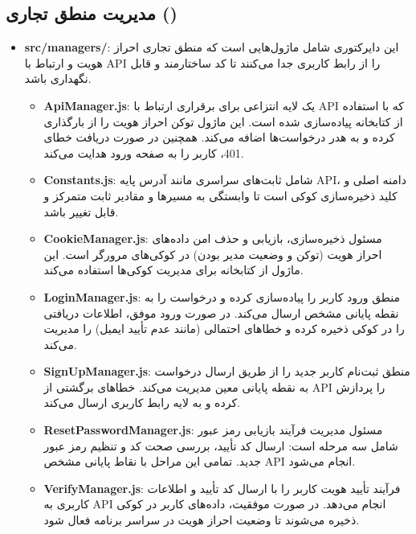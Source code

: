     \subsection{مدیریت منطق تجاری ()}
    \begin{itemize}
    	\item \textbf{src/managers/}: این دایرکتوری شامل ماژول‌هایی است که منطق تجاری احراز هویت و ارتباط با API را از رابط کاربری جدا می‌کنند تا کد ساختارمند و قابل نگهداری باشد.
    	\begin{itemize}
    		\item \textbf{ApiManager.js}: یک لایه انتزاعی برای برقراری ارتباط با API که با استفاده از کتابخانه  پیاده‌سازی شده است. این ماژول توکن احراز هویت را از  بارگذاری کرده و به هدر درخواست‌ها اضافه می‌کند. همچنین در صورت دریافت خطای 401، کاربر را به صفحه ورود هدایت می‌کند.
    		\item \textbf{Constants.js}: شامل ثابت‌های سراسری مانند آدرس پایه API، دامنه اصلی و کلید ذخیره‌سازی کوکی است تا وابستگی به مسیرها و مقادیر ثابت متمرکز و قابل تغییر باشد.
    		\item \textbf{CookieManager.js}: مسئول ذخیره‌سازی، بازیابی و حذف امن داده‌های احراز هویت (توکن و وضعیت مدیر بودن) در کوکی‌های مرورگر است. این ماژول از کتابخانه  برای مدیریت کوکی‌ها استفاده می‌کند.
    		\item \textbf{LoginManager.js}: منطق ورود کاربر را پیاده‌سازی کرده و درخواست را به نقطه پایانی مشخص ارسال می‌کند. در صورت ورود موفق، اطلاعات دریافتی را در کوکی ذخیره کرده و خطاهای احتمالی (مانند عدم تأیید ایمیل) را مدیریت می‌کند.
    		\item \textbf{SignUpManager.js}: منطق ثبت‌نام کاربر جدید را از طریق ارسال درخواست به نقطه پایانی معین مدیریت می‌کند. خطاهای برگشتی از API را پردازش کرده و به لایه رابط کاربری ارسال می‌کند.
    		\item \textbf{ResetPasswordManager.js}: مسئول مدیریت فرآیند بازیابی رمز عبور شامل سه مرحله است: ارسال کد تأیید، بررسی صحت کد و تنظیم رمز عبور جدید. تمامی این مراحل با نقاط پایانی مشخص API انجام می‌شود.
    		\item \textbf{VerifyManager.js}: فرآیند تأیید هویت کاربر را با ارسال کد تأیید و اطلاعات کاربری به API انجام می‌دهد. در صورت موفقیت، داده‌های کاربر در کوکی ذخیره می‌شوند تا وضعیت احراز هویت در سراسر برنامه فعال شود.
    	\end{itemize}
    \end{itemize}
    
